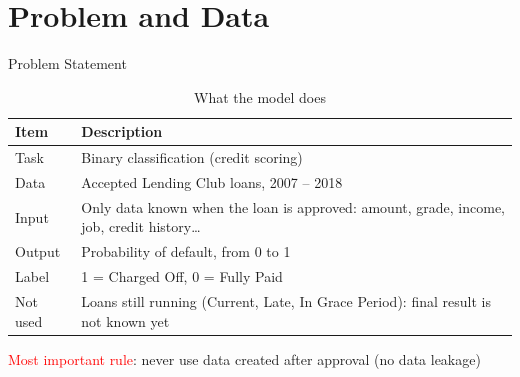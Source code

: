 \documentclass{beamer}
\begin{document}
\section{Problem and Data}

\begin{frame}{Problem Statement}
  \begin{table}
    \centering
    \small
    \caption{What the model does}
    \begin{tabular}{lp{}}
      \hline
      \textbf{Item} & \textbf{Description}\\
      \hline
      Task & Binary classification (credit scoring)\\
      Data & Accepted Lending Club loans, 2007 -- 2018\\
      Input & Only data known when the loan is approved: amount, grade, income, job, credit history\ldots\\
      Output & Probability of default, from 0 to 1\\
      Label & 1 = Charged Off, 0 = Fully Paid\\
      Not used & Loans still running (Current, Late, In Grace Period): final result is not known yet\\
      \hline
    \end{tabular}
  \end{table}
  \textcolor{red}{Most important rule}: never use data created after approval (no data leakage)
\end{frame}
\end{document}
